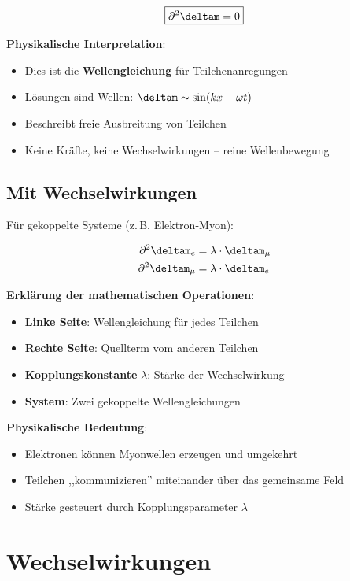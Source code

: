 	\begin{equation}
		\boxed{\partial^2 \deltam = 0}
		\label{eq:field_equation}
	\end{equation}
	
	\textbf{Physikalische Interpretation}: 
	\begin{itemize}
		\item Dies ist die \textbf{Wellengleichung} für Teilchenanregungen
		\item Lösungen sind Wellen: $\deltam \sim \sin(kx - \omega t)$
		\item Beschreibt freie Ausbreitung von Teilchen
		\item Keine Kräfte, keine Wechselwirkungen -- reine Wellenbewegung
	\end{itemize}
	
	\subsection{Mit Wechselwirkungen}
	
	Für gekoppelte Systeme (z.\,B. Elektron-Myon):
	
	\begin{align}
		\partial^2 \deltam_e &= \lambda \cdot \deltam_{\mu} \\
		\partial^2 \deltam_{\mu} &= \lambda \cdot \deltam_e
	\end{align}
	
	\textbf{Erklärung der mathematischen Operationen}:
	\begin{itemize}
		\item \textbf{Linke Seite}: Wellengleichung für jedes Teilchen
		\item \textbf{Rechte Seite}: Quellterm vom anderen Teilchen
		\item \textbf{Kopplungskonstante} $\lambda$: Stärke der Wechselwirkung
		\item \textbf{System}: Zwei gekoppelte Wellengleichungen
	\end{itemize}
	
	\textbf{Physikalische Bedeutung}:
	\begin{itemize}
		\item Elektronen können Myonwellen erzeugen und umgekehrt
		\item Teilchen ,,kommunizieren'' miteinander über das gemeinsame Feld
		\item Stärke gesteuert durch Kopplungsparameter $\lambda$
	\end{itemize}

	\section{Wechselwirkungen}
	
